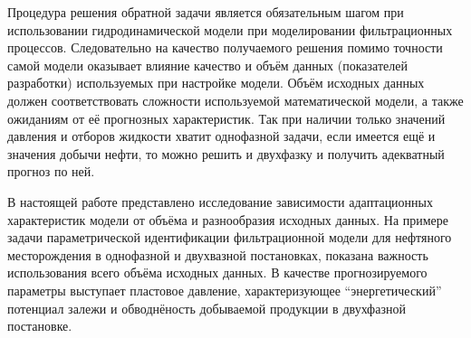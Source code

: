 \documentclass{article}
\begin{document}
	Процедура решения обратной задачи является обязательным шагом при использовании гидродинамической модели при моделировании фильтрационных процессов. Следовательно на качество получаемого решения помимо точности самой модели оказывает влияние качество и объём данных (показателей разработки) используемых при настройке модели. Объём исходных данных должен соответствовать сложности используемой математической модели, а также ожиданиям от её прогнозных характеристик. Так при наличии только значений давления и отборов жидкости хватит однофазной задачи, если имеется ещё и значения добычи нефти, то можно решить и двухфазку и получить адекватный прогноз по ней.
	
	В настоящей работе представлено исследование зависимости адаптационных характеристик модели от объёма и разнообразия исходных данных. На примере задачи параметрической идентификации фильтрационной модели для нефтяного месторождения в однофазной и двухвазной постановках, показана важность использования всего объёма исходных данных. В качестве прогнозируемого параметры выступает пластовое давление, характеризующее “энергетический” потенциал залежи и обводнёность добываемой продукции в двухфазной постановке.
\end{document}
